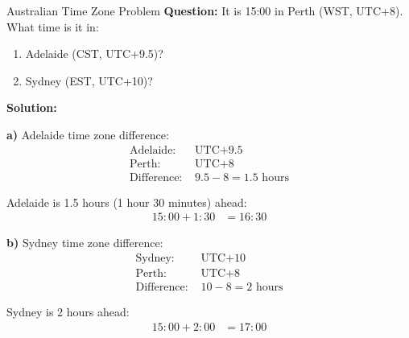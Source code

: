 \documentclass[12pt,a4paper]{article}
\begin{document}
\begin{examplebox}{Australian Time Zone Problem}
\textbf{Question:} It is 15:00 in Perth (WST, UTC+8). What time is it in:
\begin{enumerate}[label=\alph*)]
\item Adelaide (CST, UTC+9.5)?
\item Sydney (EST, UTC+10)?
\end{enumerate}

\textbf{Solution:}

\textbf{a)} Adelaide time zone difference:
\begin{align*}
\text{Adelaide: } &\text{UTC+9.5} \\
\text{Perth: } &\text{UTC+8} \\
\text{Difference: } &9.5 - 8 = 1.5\text{ hours}
\end{align*}

Adelaide is 1.5 hours (1 hour 30 minutes) ahead:
\begin{align*}
15:00 + 1:30 &= \boxed{16:30}
\end{align*}

\textbf{b)} Sydney time zone difference:
\begin{align*}
\text{Sydney: } &\text{UTC+10} \\
\text{Perth: } &\text{UTC+8} \\
\text{Difference: } &10 - 8 = 2\text{ hours}
\end{align*}

Sydney is 2 hours ahead:
\begin{align*}
15:00 + 2:00 &= \boxed{17:00}
\end{align*}
\end{examplebox}
\end{document}
